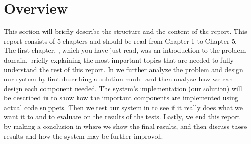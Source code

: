 \section{Overview}\label{sec:overview}
This section will briefly describe the structure and the content of the report. This report consists of 5 chapters and should be read from Chapter 1 to Chapter 5. The first chapter, , which you have just read, was an introduction to the problem domain, briefly explaining the most important topics that are needed to fully understand the rest of this report. In  we further analyze the problem and design our system by first describing a solution model and then analyze how we can design each component needed. The system's implementation (our solution) will be described in  to show how the important components are implemented using actual code snippets. Then we test our system in  to see if it really does what we want it to and to evaluate on the results of the tests. Lastly, we end this report by making a conclusion in  where we show the final results, and then discuss these results and how the system may be further improved. 
